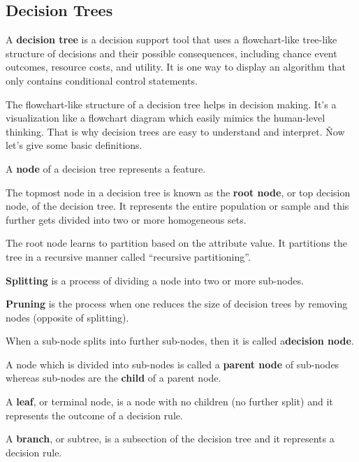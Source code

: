 \subsection{Decision Trees}

A \textbf{decision tree} is a decision support tool that uses a flowchart-like tree-like structure of decisions and
their possible consequences, including chance event outcomes, resource costs, and utility. It is one way to display
an algorithm that only contains conditional control statements.
\ed

The flowchart-like structure of a decision tree helps in decision making. It's a visualization like a flowchart
diagram which easily mimics the human-level thinking. That is why decision trees are easy to understand and interpret. \v

Now let's give some basic definitions.

\bd [Node]
A \textbf{node} of a decision tree represents a feature.
\ed

The topmost node in a decision tree is known as the \textbf{root node}, or top decision node, of the decision tree.
It represents the entire population or sample and this further gets divided into two or more homogeneous sets.
\ed

The root node learns to partition based on the attribute value. It partitions the tree in a recursive manner called
``recursive partitioning''.

\bd [Splitting]
\textbf{Splitting} is a process of dividing a node into two or more sub-nodes.
\ed

\bd [Pruning]
\textbf{Pruning} is the process when one reduces the size of decision trees by removing nodes (opposite of splitting).
\ed

When a sub-node splits into further sub-nodes, then it is called a\textbf{decision node}.
\ed

A node which is divided into sub-nodes is called a \textbf{parent node} of sub-nodes whereas sub-nodes are the
\textbf{child} of a parent node.
\ed

\bd [Leaf]
A \textbf{leaf}, or terminal node, is a node with no children (no further split) and it represents the outcome of a
decision rule.
\ed

\bd [Branch]
A \textbf{branch}, or subtree, is a subsection of the decision tree and it represents a decision rule.
\ed

\vspace{-10pt}

